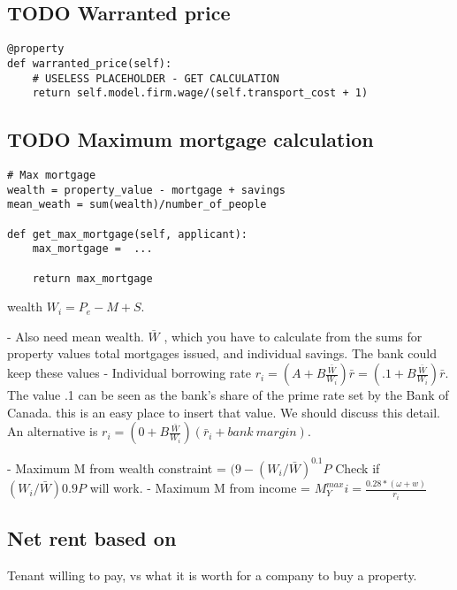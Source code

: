 \subsection{TODO Warranted price}
\begin{lstlisting}
@property
def warranted_price(self):
    # USELESS PLACEHOLDER - GET CALCULATION
    return self.model.firm.wage/(self.transport_cost + 1) 
\end{lstlisting}

\subsection{TODO Maximum mortgage calculation}


\begin{lstlisting}
# Max mortgage
wealth = property_value - mortgage + savings
mean_weath = sum(wealth)/number_of_people

def get_max_mortgage(self, applicant):
    max_mortgage =  ...
    
    return max_mortgage
\end{lstlisting}

wealth $W_i = P_e-M+S$.  

- Also need mean wealth. $\bar W$ , which you have to calculate from the sums for property values total mortgages issued, and individual savings. The bank could keep these values
- Individual borrowing rate 
$r_i = (A + B \frac{\bar{W}}{W_i})\bar r=(.1 + B \frac{\bar{W}}{W_i})\bar r$.
The value .1 can be seen as the bank's share of the prime rate set by the Bank of Canada. this is an easy place to insert that value. We should discuss this detail. An alternative is
$r_i = (0 + B \frac{\bar{W}}{W_i})(\bar r_i+ bank\ margin)$.

- Maximum M  from wealth constraint = $(9-(W_i/\bar W)^{0.1}P$
  Check if $(W_i/\bar W)0.9P$ will work. 
- Maximum M  from income = $M^{max}_Yi = \frac{0.28*(\omega+w)}{r_i}$ 


 
\subsection{Net rent based on}
Tenant willing to pay, vs what it is worth for a company to buy a property.

